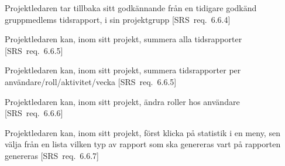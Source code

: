 \documentclass[a4paper]{article}
\begin{document}
\begin{appendices}
\begin{FT}
\item
Projektledaren tar tillbaka sitt godkännande från en tidigare godkänd gruppmedlems tidsrapport, i sin projektgrupp [SRS~req.~6.6.4]

\item
Projektledaren kan, inom sitt projekt, summera alla tidsrapporter [SRS~req.~6.6.5]

\item
Projektledaren kan, inom sitt projekt, summera tidsrapporter per användare/roll/aktivitet/vecka [SRS~req.~6.6.5]

\item
Projektledaren kan, inom sitt projekt, ändra roller hos användare [SRS~req.~6.6.6]

\item
Projektledaren kan, inom sitt projekt, först klicka på statistik i en meny, sen välja från en lista vilken typ av rapport som ska genereras vart på rapporten genereras [SRS~req.~6.6.7]

\end{FT}
\end{appendices}



\newpage
\end{document}
